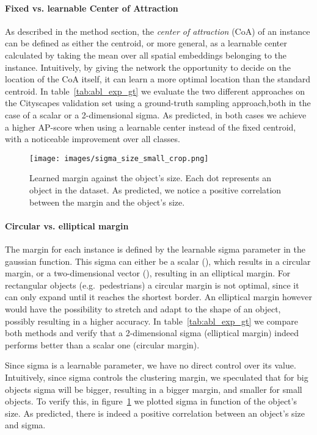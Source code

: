 \paragraph{Fixed vs. learnable Center of Attraction}
As described in the method section, the \textit{center of attraction} (CoA) of an instance can be defined as either the centroid, or more general, as a learnable center calculated by taking the mean over all spatial embeddings belonging to the instance. Intuitively, by giving the network the opportunity to decide on the location of the CoA itself, it can learn a more optimal location than the standard centroid. In table~\ref{tab:abl_exp_gt} we evaluate the two different approaches on the Cityscapes validation set using a ground-truth sampling approach,both in the case of a scalar or a 2-dimensional sigma. As predicted, in both cases we achieve a higher AP-score when using a learnable center instead of the fixed centroid, with a noticeable improvement over all classes. 

\begin{figure}
    \begin{center}
    	\texttt{[image: images/sigma\_size\_small\_crop.png]}
    \end{center}
    \caption{Learned margin against the object's size. Each dot represents an object in the dataset. As predicted, we notice a positive correlation between the margin and the object's size.}
    \label{fig:sigma_vs_size}
\end{figure}

\paragraph{Circular vs. elliptical margin}
The margin for each instance is defined by the learnable sigma parameter in the gaussian function. This sigma can either be a scalar (), which results in a circular margin, or a two-dimensional vector (), resulting in an elliptical margin. For rectangular objects (e.g.~pedestrians) a circular margin is not optimal, since it can only expand until it reaches the shortest border. An elliptical margin however would have the possibility to stretch and adapt to the shape of an object, possibly resulting in a higher accuracy. In table~\ref{tab:abl_exp_gt} we compare both methods and verify that a 2-dimensional sigma (elliptical margin) indeed performs better than a scalar one (circular margin).

Since sigma is a learnable parameter, we have no direct control over its value. Intuitively, since sigma controls the clustering margin, we speculated that for big objects sigma will be bigger, resulting in a bigger margin, and smaller for small objects. To verify this, in figure~\ref{fig:sigma_vs_size} we plotted sigma in function of the object's size. As predicted, there is indeed a positive correlation between an object's size and sigma.

